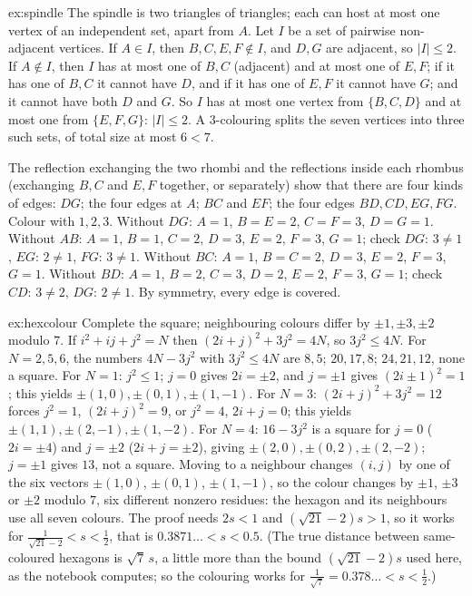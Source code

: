 \begin{solution}{ex:spindle}
\idea The spindle is two triangles of triangles; each can host at most one vertex of an independent set, apart from $A$.
\writeup Let $I$ be a set of pairwise non-adjacent vertices. If $A\in I$, then $B,C,E,F\notin I$, and $D,G$ are adjacent, so $|I|\le2$. If $A\notin I$,
then $I$ has at most one of $B,C$ (adjacent) and at most one of $E,F$; if it has one of $B,C$ it cannot have $D$, and if it has one of $E,F$ it cannot
have $G$; and it cannot have both $D$ and $G$. So $I$ has at most one vertex from $\{B,C,D\}$ and at most one from $\{E,F,G\}$: $|I|\le2$. A
$3$-colouring splits the seven vertices into three such sets, of total size at most $6<7$.

The reflection exchanging the two rhombi and the reflections inside each rhombus (exchanging $B,C$ and $E,F$ together, or separately) show that there are
four kinds of edges: $DG$; the four edges at $A$; $BC$ and $EF$; the four edges $BD,CD,EG,FG$. Colour with $1,2,3$. Without $DG$: $A=1$, $B=E=2$,
$C=F=3$, $D=G=1$. Without $AB$: $A=1$, $B=1$, $C=2$, $D=3$, $E=2$, $F=3$, $G=1$; check $DG$: $3\ne1$, $EG$: $2\ne1$, $FG$: $3\ne1$. Without $BC$:
$A=1$, $B=C=2$, $D=3$, $E=2$, $F=3$, $G=1$. Without $BD$: $A=1$, $B=2$, $C=3$, $D=2$, $E=2$, $F=3$, $G=1$; check $CD$: $3\ne2$, $DG$: $2\ne1$. By
symmetry, every edge is covered.
\end{solution}

\begin{solution}{ex:hexcolour}
\idea Complete the square; neighbouring colours differ by $\pm1,\pm3,\pm2$ modulo $7$.
\writeup If $i^2+ij+j^2=N$ then $(2i+j)^2+3j^2=4N$, so $3j^2\le4N$. For $N=2,5,6$, the numbers $4N-3j^2$ with $3j^2\le4N$ are $8,5$; $20,17,8$;
$24,21,12$, none a square. For $N=1$: $j^2\le1$; $j=0$ gives $2i=\pm2$, and $j=\pm1$ gives $(2i\pm1)^2=1$; this yields $\pm(1,0),\pm(0,1),\pm(1,-1)$. For
$N=3$: $(2i+j)^2+3j^2=12$ forces $j^2=1$, $(2i+j)^2=9$, or $j^2=4$, $2i+j=0$; this yields $\pm(1,1),\pm(2,-1),\pm(1,-2)$. For $N=4$: $16-3j^2$ is a square
for $j=0$ ($2i=\pm4$) and $j=\pm2$ ($2i+j=\pm2$), giving $\pm(2,0),\pm(0,2),\pm(2,-2)$; $j=\pm1$ gives $13$, not a square.
Moving to a neighbour changes $(i,j)$ by one of the six vectors $\pm(1,0)$, $\pm(0,1)$, $\pm(1,-1)$, so the colour changes by $\pm1$, $\pm3$
or $\pm2$ modulo $7$, six different nonzero residues: the hexagon and its neighbours use all seven colours. The proof needs $2s<1$ and $(\sqrt{21}-2)s>1$, so it works for
$\frac1{\sqrt{21}-2}<s<\frac12$, that is $0.3871\ldots<s<0.5$. (The true distance between same-coloured hexagons is $\sqrt7\,s$, a little more than the bound $(\sqrt{21}-2)s$
used here, as the notebook computes; so the colouring works for $\frac1{\sqrt7}=0.378\ldots<s<\frac12$.)
\end{solution}

